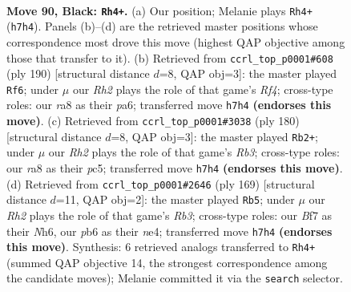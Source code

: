 \documentclass[11pt]{article}
\begin{document}
\clearpage

\begin{figure}[p]\centering
\begin{subfigure}{0.46\textwidth}\centering
\resizebox{\linewidth}{!}{%
\newchessgame
\chessboard[
  setfen={R7/5b1r/1P1k4/6R1/4K3/8/8/8 b - - 0 90},
  showmover=false,
  pgfstyle=straightmove, color=movearrow, markmove={h7-h4}
]}
\caption{}
\end{subfigure}\hfill
\begin{subfigure}{0.46\textwidth}\centering
\resizebox{\linewidth}{!}{%
\newchessgame
\chessboard[
  setfen={8/8/p7/6r1/5R2/5B1k/5K2/8 w - - 20 96},
  showmover=false,
  pgfstyle=straightmove, color=movearrow, markmove={f4-f6}
]}
\caption{}
\end{subfigure}
\\[4pt]
\begin{subfigure}{0.46\textwidth}\centering
\resizebox{\linewidth}{!}{%
\newchessgame
\chessboard[
  setfen={8/8/8/2p5/5K1p/1R1B4/5k2/4r3 w - - 0 91},
  showmover=false,
  pgfstyle=straightmove, color=movearrow, markmove={b3-b2}
]}
\caption{}
\end{subfigure}\hfill
\begin{subfigure}{0.46\textwidth}\centering
\resizebox{\linewidth}{!}{%
\newchessgame
\chessboard[
  setfen={5k2/R7/1r5n/8/4NP1K/8/8/8 b - - 12 85},
  showmover=false,
  pgfstyle=straightmove, color=movearrow, markmove={b6-b5}
]}
\caption{}
\end{subfigure}
\caption{\textbf{Move 90, Black: \texttt{Rh4+}.} (a) Our position; Melanie plays \texttt{Rh4+} (\texttt{h7h4}). Panels (b)--(d) are the retrieved master positions whose correspondence most drove this move (highest QAP objective among those that transfer to it). (b) Retrieved from \texttt{ccrl\_top\_p0001\#608} (ply 190) [structural distance $d$=8, QAP obj=3]: the master played \texttt{Rf6}; under $\mu$ our \emph{Rh2} plays the role of that game's \emph{Rf4}; cross-type roles: our \emph{r}a8 as their \emph{p}a6; transferred move \texttt{h7h4} \textbf{(endorses this move)}. (c) Retrieved from \texttt{ccrl\_top\_p0001\#3038} (ply 180) [structural distance $d$=8, QAP obj=3]: the master played \texttt{Rb2+}; under $\mu$ our \emph{Rh2} plays the role of that game's \emph{Rb3}; cross-type roles: our \emph{r}a8 as their \emph{p}c5; transferred move \texttt{h7h4} \textbf{(endorses this move)}. (d) Retrieved from \texttt{ccrl\_top\_p0001\#2646} (ply 169) [structural distance $d$=11, QAP obj=2]: the master played \texttt{Rb5}; under $\mu$ our \emph{Rh2} plays the role of that game's \emph{Rb3}; cross-type roles: our \emph{B}f7 as their \emph{N}h6, our \emph{p}b6 as their \emph{n}e4; transferred move \texttt{h7h4} \textbf{(endorses this move)}. Synthesis: 6 retrieved analogs transferred to \texttt{Rh4+} (summed QAP objective 14, the strongest correspondence among the candidate moves); Melanie committed it via the \texttt{search} selector.}
\label{fig:thought-m179}
\end{figure}
\end{document}
